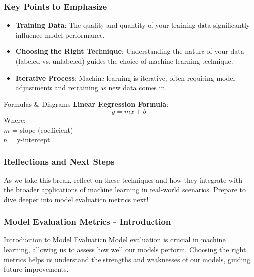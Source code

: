 \documentclass[aspectratio=169]{beamer}
\begin{document}
\begin{frame}[fragile]
    \frametitle{Key Points to Emphasize}
    \begin{itemize}
        \item \textbf{Training Data}: The quality and quantity of your training data significantly influence model performance.
        \item \textbf{Choosing the Right Technique}: Understanding the nature of your data (labeled vs. unlabeled) guides the choice of machine learning technique.
        \item \textbf{Iterative Process}: Machine learning is iterative, often requiring model adjustments and retraining as new data comes in.
    \end{itemize}
    \begin{block}{Formulas \& Diagrams}
        \textbf{Linear Regression Formula}: \\
        \begin{equation}
            y = mx + b
        \end{equation}
        Where: \\
        \( m \) = slope (coefficient) \\
        \( b \) = y-intercept
    \end{block}
\end{frame}

\begin{frame}[fragile]
    \frametitle{Reflections and Next Steps}
    As we take this break, reflect on these techniques and how they integrate with the broader applications of machine learning in real-world scenarios. Prepare to dive deeper into model evaluation metrics next!
\end{frame}

\begin{frame}[fragile]
    \frametitle{Model Evaluation Metrics - Introduction}
    \begin{block}{Introduction to Model Evaluation}
        Model evaluation is crucial in machine learning, allowing us to assess how well our models perform. Choosing the right metrics helps us understand the strengths and weaknesses of our models, guiding future improvements.
    \end{block}
\end{frame}
\end{document}
